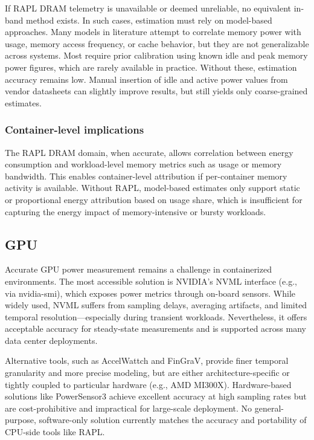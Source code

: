 If RAPL DRAM telemetry is unavailable or deemed unreliable, no equivalent in-band method exists. In such cases, estimation must rely on model-based approaches. Many models in literature attempt to correlate memory power with usage, memory access frequency, or cache behavior, but they are not generalizable across systems. Most require prior calibration using known idle and peak memory power figures, which are rarely available in practice. Without these, estimation accuracy remains low. Manual insertion of idle and active power values from vendor datasheets can slightly improve results, but still yields only coarse-grained estimates.

\subsubsection{Container-level implications}
The RAPL DRAM domain, when accurate, allows correlation between energy consumption and workload-level memory metrics such as usage or memory bandwidth. This enables container-level attribution if per-container memory activity is available. Without RAPL, model-based estimates only support static or proportional energy attribution based on usage share, which is insufficient for capturing the energy impact of memory-intensive or bursty workloads.

\subsection{GPU}

Accurate GPU power measurement remains a challenge in containerized environments. The most accessible solution is NVIDIA’s NVML interface (e.g., via nvidia-smi), which exposes power metrics through on-board sensors. While widely used, NVML suffers from sampling delays, averaging artifacts, and limited temporal resolution—especially during transient workloads. Nevertheless, it offers acceptable accuracy for steady-state measurements and is supported across many data center deployments.

Alternative tools, such as AccelWattch and FinGraV, provide finer temporal granularity and more precise modeling, but are either architecture-specific or tightly coupled to particular hardware (e.g., AMD MI300X). Hardware-based solutions like PowerSensor3 achieve excellent accuracy at high sampling rates but are cost-prohibitive and impractical for large-scale deployment. No general-purpose, software-only solution currently matches the accuracy and portability of CPU-side tools like RAPL.

